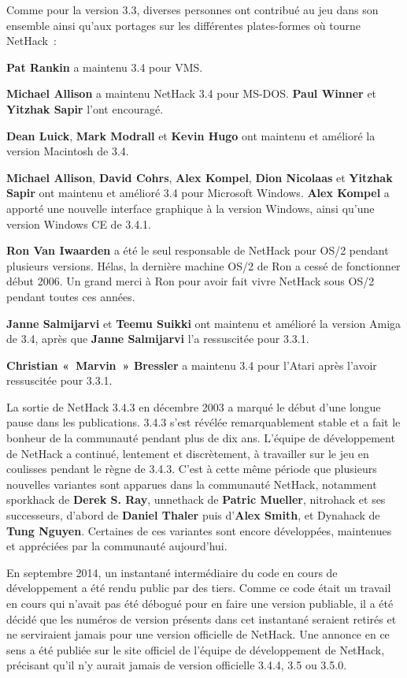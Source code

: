 \documentclass[titlepage]{article}
\begin{document}
Comme pour la version 3.3, diverses personnes ont contribué au jeu dans son
ensemble ainsi qu'aux portages sur les différentes plates-formes où tourne
NetHack~:


\textbf{Pat Rankin} a maintenu 3.4 pour VMS.


\textbf{Michael Allison} a maintenu NetHack 3.4 pour MS-DOS.
\textbf{Paul Winner} et \textbf{Yitzhak Sapir} l'ont encouragé.


\textbf{Dean Luick}, \textbf{Mark Modrall} et \textbf{Kevin Hugo} ont maintenu et
amélioré la version Macintosh de 3.4.


\textbf{Michael Allison}, \textbf{David Cohrs}, \textbf{Alex Kompel},
\textbf{Dion Nicolaas} et
\textbf{Yitzhak Sapir} ont maintenu et amélioré 3.4 pour Microsoft Windows.
\textbf{Alex Kompel} a apporté une nouvelle interface graphique à la version
Windows, ainsi qu'une version Windows CE de 3.4.1.


\textbf{Ron Van Iwaarden} a été le seul responsable de NetHack pour OS/2
pendant plusieurs versions.
Hélas, la dernière machine OS/2 de Ron a cessé de fonctionner début 2006.
Un grand merci à Ron pour avoir fait vivre NetHack sous OS/2 pendant toutes
ces années.


\textbf{Janne Salmijarvi} et \textbf{Teemu Suikki} ont maintenu et amélioré la
version Amiga de 3.4, après que \textbf{Janne Salmijarvi} l'a ressuscitée pour
3.3.1.


\textbf{Christian «~Marvin~» Bressler} a maintenu 3.4 pour l'Atari
après l'avoir ressuscitée pour 3.3.1.


La sortie de NetHack 3.4.3 en décembre 2003 a marqué le début d'une longue
pause dans les publications.
3.4.3 s'est révélée remarquablement stable et a fait le bonheur de la
communauté pendant plus de dix ans.
L'équipe de développement de NetHack a continué, lentement et
discrètement, à travailler sur le jeu en coulisses pendant le règne de
3.4.3.
C'est à cette même période que plusieurs nouvelles variantes sont apparues
dans la communauté NetHack, notamment sporkhack de \textbf{Derek S. Ray},
unnethack de \textbf{Patric Mueller}, nitrohack et ses successeurs, d'abord de
\textbf{Daniel Thaler} puis d'\textbf{Alex Smith}, et Dynahack de \textbf{Tung
Nguyen}.
Certaines de ces variantes sont encore développées, maintenues et
appréciées par la communauté aujourd'hui.


En septembre 2014, un instantané intermédiaire du code en cours de
développement a été rendu public par des tiers.
Comme ce code était un travail en cours qui n'avait pas été débogué pour en
faire une version publiable, il a été décidé que les numéros de version
présents dans cet instantané seraient retirés et ne serviraient jamais
pour une version officielle de NetHack.
Une annonce en ce sens a été publiée sur le site officiel de l'équipe de
développement de NetHack,
précisant qu'il n'y aurait jamais de version officielle 3.4.4, 3.5 ou 3.5.0.
\end{document}
